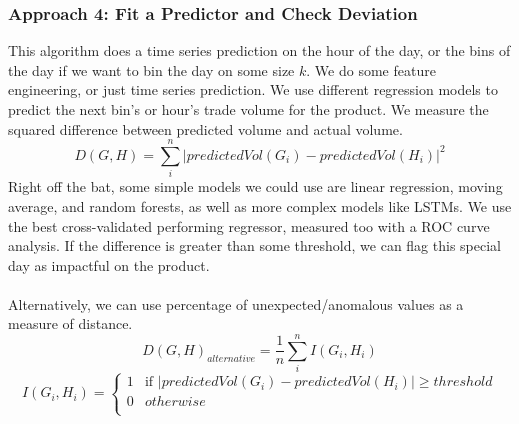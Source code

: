 \documentclass[11pt]{paper}
\begin{document}
\subsubsection*{Approach 4: Fit a Predictor and Check Deviation}
This algorithm does a time series prediction on the hour of the day, or the bins of the day if we want to bin the day on some size $k$. We do some feature engineering, or just time series prediction. We use different regression models to predict the next bin's or hour's trade volume for the product. We measure the squared difference between predicted volume and actual volume.
$$D(G,H) = \sum_i^n |predictedVol(G_i)-predictedVol(H_i)|^2$$
Right off the bat, some simple models we could use are linear regression, moving average, and random forests, as well as more complex models like LSTMs. We use the best cross-validated performing regressor, measured too with a ROC curve analysis. If the difference is greater than some threshold, we can flag this special day as impactful on the product. 
\\\\Alternatively, we can use percentage of unexpected/anomalous values as a measure of distance.
$$D(G,H)_{alternative} = \frac{1}{n}\sum_i^n I(G_i, H_i)$$
\[ I(G_i, H_i) =  \left\{ 
\begin{array}{ll}
      1 & \text{if }|predictedVol(G_i)-predictedVol(H_i)| \geq threshold \\
      0 & otherwise  \\
      \end{array} 
\right. \]
\\\\\\\\\\\\\\\\\\\\\\
\end{document}
